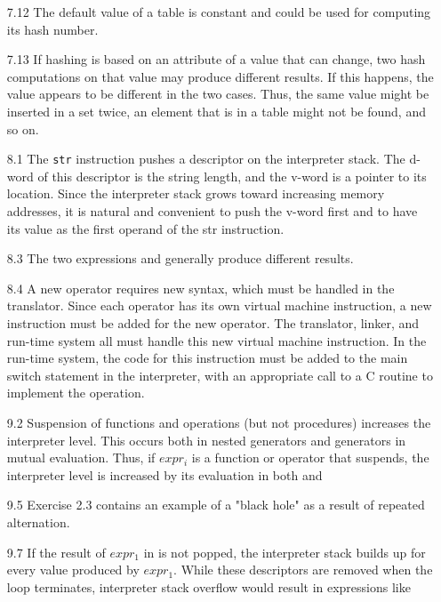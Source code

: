 \begin{itemize}
\goodbreak\item[7.12]
The default value of a table is constant and could be used for computing
its hash number.

\goodbreak\item[7.13]
If hashing is based on an attribute of a value that can change, two hash
computations on that value may produce different results. If this happens,
the value appears to be different in the two cases. Thus, the same value
might be inserted in a set twice, an element that is in a table might not be
found, and so on.

\goodbreak\item[8.1]
The \texttt{str} instruction pushes a descriptor on the interpreter stack. 
The d-word of this descriptor is the string length, and the v-word is a pointer
to its location. Since the interpreter stack grows toward increasing memory
addresses, it is natural and convenient to push the v-word first and to have its
value as the first operand of the str instruction.

\goodbreak\item[8.3]
The two expressions
and
generally produce different results.

\goodbreak\item[8.4]
A new operator requires new syntax, which must be handled in the translator.
Since each operator has its own virtual machine instruction, a new
instruction must be added for the new operator. The translator, linker, and
run-time system all must handle this new virtual machine instruction. In
the run-time system, the code for this instruction must be added to the
main switch statement in the interpreter, with an appropriate call to a C
routine to implement the operation.

\goodbreak\item[9.2]
Suspension of functions and operations (but not procedures) increases the
interpreter level. This occurs both in nested generators and generators in
mutual evaluation. Thus, if $expr_i$ is a function or operator that suspends,
the interpreter level is increased by its evaluation in both
and

\goodbreak\item[9.5]
Exercise 2.3 contains an example of a "black hole" as a result of
repeated alternation.

\goodbreak\item[9.7]
If the result of $expr_1$ in
is not popped, the interpreter stack builds up for every value produced by
$expr_1$. While these descriptors are removed when the loop terminates,
interpreter stack overflow would result in expressions like


\end{itemize}
